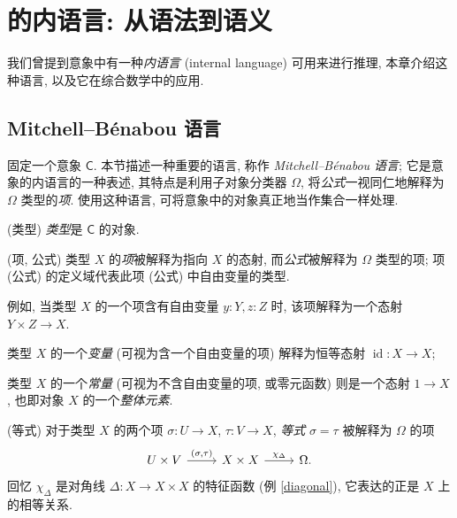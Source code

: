\chapter{\topos{}的内语言: 从语法到语义}


我们曾提到意象中有一种\emph{内语言} (internal language) 可用来进行推理, 本章介绍这种语言, 以及它在综合数学中的应用.


\section{Mitchell--B\'enabou 语言}

固定一个意象 $\mathsf C$. 本节描述一种重要的语言, 称作 \emph{Mitchell--B\'enabou 语言}; 它是意象的内语言的一种表述, 其特点是利用子对象分类器 $\Omega$, 将\emph{公式}一视同仁地解释为 $\Omega$ 类型的\emph{项}. 使用这种语言, 可将意象中的对象真正地当作集合一样处理.

\begin{definition}
    {(类型)}
    \emph{类型}是 $\mathsf C$ 的对象.
\end{definition}

\begin{definition}
    {(项, 公式)}
    类型 $X$ 的\emph{项}被解释为指向 $X$ 的态射, 而\emph{公式}被解释为 $\Omega$ 类型的项;
    项 (公式) 的定义域代表此项 (公式) 中自由变量的类型.
    
    例如, 当类型 $X$ 的一个项含有自由变量 $y\colon Y, z\colon Z$ 时, 该项解释为一个态射 $Y\times Z \to X$.
    
    类型 $X$ 的一个\emph{变量} (可视为含一个自由变量的项) 解释为恒等态射 $\operatorname{id}\colon X \to X$;
    
    类型 $X$ 的一个\emph{常量} (可视为不含自由变量的项, 或零元函数) 则是一个态射 $1 \to X$, 也即对象 $X$ 的一个\emph{整体元素}.
\end{definition}

\begin{definition}
	{(等式)}
	对于类型 $X$ 的两个项 $\sigma\colon U \to X$, $\tau\colon V \to X$, \emph{等式} $\sigma = \tau$ 被解释为 $\Omega$ 的项
	\[\begin{tikzcd}[ampersand replacement=\&]
		{U\times V} \& {X\times X} \& \Omega.
		\arrow["{(\sigma,\tau)}", from=1-1, to=1-2]
		\arrow["{\chi_{\Delta}}", from=1-2, to=1-3]
	\end{tikzcd}\]
	回忆 $\chi_{\Delta}$ 是对角线 $\Delta\colon X\to X\times X$ 的特征函数 (例 \ref{diagonal}), 它表达的正是 $X$ 上的相等关系.
\end{definition}


